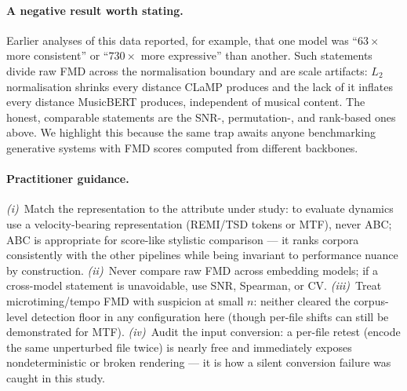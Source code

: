 \documentclass[11pt]{article}
\begin{document}
\paragraph{A negative result worth stating.}
Earlier analyses of this data reported, for example, that one model was
``$63\times$ more consistent'' or ``$730\times$ more expressive'' than
another. Such statements divide raw FMD across the normalisation boundary
and are scale artifacts: $L_2$ normalisation shrinks every distance CLaMP
produces and the lack of it inflates every distance MusicBERT produces,
independent of musical content. The honest, comparable statements are the
SNR-, permutation-, and rank-based ones above. We highlight this because the
same trap awaits anyone benchmarking generative systems with FMD scores
computed from different backbones.

\paragraph{Practitioner guidance.}
\emph{(i)}~Match the representation to the attribute under study: to
evaluate dynamics use a velocity-bearing representation (REMI/TSD tokens or
MTF), never ABC; ABC is appropriate for score-like stylistic comparison ---
it ranks corpora consistently with the other pipelines while being
invariant to performance nuance by construction.
\emph{(ii)}~Never compare raw FMD across embedding models; if a cross-model
statement is unavoidable, use SNR, Spearman, or CV. \emph{(iii)}~Treat
microtiming/tempo FMD with suspicion at small $n$: neither cleared the
corpus-level detection floor in any configuration here (though per-file
shifts can still be demonstrated for MTF). \emph{(iv)}~Audit the input
conversion: a per-file retest (encode the same unperturbed file twice) is
nearly free and immediately exposes nondeterministic or broken rendering
--- it is how a silent conversion failure was caught in this study.

\end{document}
